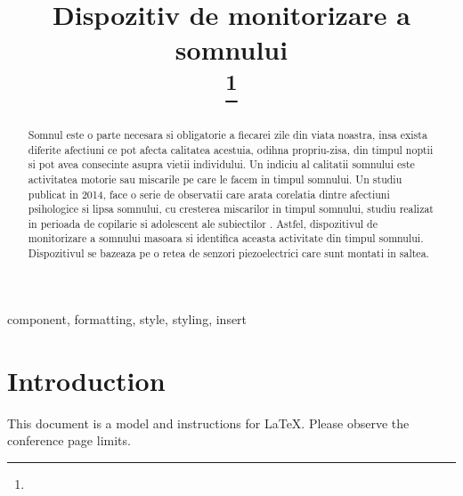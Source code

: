 \documentclass[conference]{IEEEtran}
\begin{document}
\title{Dispozitiv de monitorizare a somnului\\
{\footnotesize \textsuperscript{}}
\thanks{}
}

\author{
\and
{}

}

\maketitle

\begin{abstract}
Somnul este o parte necesara si obligatorie a fiecarei zile din viata noastra, insa exista diferite afectiuni ce pot afecta calitatea acestuia, odihna propriu-zisa, din timpul noptii si pot avea consecinte asupra vietii individului. Un indiciu al calitatii somnului este activitatea motorie sau miscarile pe care le facem in timpul somnului. Un studiu publicat in 2014, face o serie de observatii care arata corelatia dintre afectiuni psihologice si lipsa somnului, cu cresterea miscarilor in timpul somnului, studiu realizat in perioada de copilarie si adolescent ale subiectilor \cite{childsleep}. Astfel, dispozitivul de monitorizare a somnului  masoara si identifica aceasta activitate din timpul somnului. Dispozitivul se bazeaza pe o retea de senzori piezoelectrici care sunt montati in saltea. 
\end{abstract}

\begin{IEEEkeywords}
component, formatting, style, styling, insert
\end{IEEEkeywords}

\section{Introduction}
This document is a model and instructions for \LaTeX.
Please observe the conference page limits. 
\end{document}

